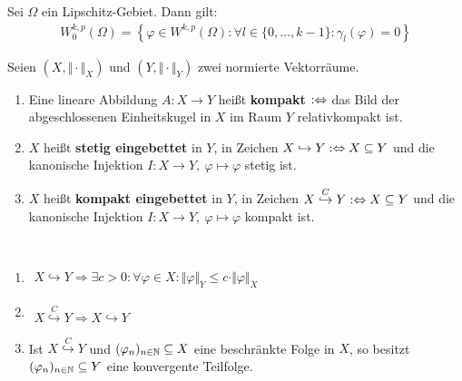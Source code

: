 \begin{satz}
	Sei $\Omega$ ein Lipschitz-Gebiet.
	Dann gilt:
	\begin{align*}
		W_0^{k,p}(\Omega)=\left\lbrace\varphi\in W^{k,p}(\Omega):
		\forall l\in\lbrace0,\ldots,k-1\rbrace:\gamma_l(\varphi)=0\right\rbrace
	\end{align*}
\end{satz}

\begin{definition}
	Seien $(X,\Vert\cdot\Vert_X)$ und $(Y,\Vert\cdot\Vert_Y)$ zwei normierte Vektorräume.
	\begin{enumerate}
		\item Eine lineare Abbildung $A:X\to Y$ heißt \textbf{kompakt} $:\Leftrightarrow$ das Bild der abgeschlossenen Einheitskugel in $X$ im Raum $Y$ relativkompakt ist.
		\item $X$ heißt \textbf{stetig eingebettet} in $Y$, in Zeichen $X\hookrightarrow Y:\Leftrightarrow X\subseteq Y$ und die kanonische Injektion $I:X\to Y,~\varphi\mapsto\varphi$ stetig ist.
		\item $X$ heißt \textbf{kompakt eingebettet} in $Y$, in Zeichen $X\stackrel{C}{\hookrightarrow} Y:\Leftrightarrow X\subseteq Y$ und die kanonische Injektion $I:X\to Y,~\varphi\mapsto\varphi$ kompakt ist.
	\end{enumerate}
\end{definition}

\begin{bemerkung}\
	\begin{enumerate}
		\item $\begin{aligned}
			X\hookrightarrow Y\Longrightarrow\exists c>0:\forall\varphi\in X:\Vert\varphi\Vert_Y\leq c\cdot\Vert\varphi\Vert_X
		\end{aligned}$
		\item $\begin{aligned}
			X\stackrel{C}{\hookrightarrow} Y\Longrightarrow X\hookrightarrow Y
		\end{aligned}$
		\item Ist $X\stackrel{C}{\hookrightarrow} Y$ und $(\varphi_n)_{n\in\mathbb{N}}\subseteq X$ eine beschränkte Folge in $X$, so besitzt $(\varphi_n)_{n\in\mathbb{N}}\subseteq Y$ eine konvergente Teilfolge.
	\end{enumerate}
\end{bemerkung}

